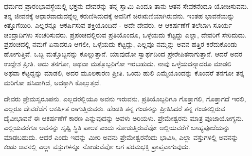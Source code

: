 ಧರ್ಮದ ಪ್ರಾರಂಭಾವಸ್ಥೆಯಲ್ಲಿ ಭಕ್ತನು ದೇವರನ್ನು ತನ್ನ ಸ್ವಾಮಿ ಎಂದೂ ತಾನು ಆತನ ಸೇವಕನೆಂದೂ ಯೋಚಿಸುವನು. ತನ್ನ ಜೀವನಕ್ಕೆ ಆಧಾರವಾದುದನ್ನೆಲ್ಲ ಕರುಣಿಸಿದುದಕ್ಕೆ ಅವನಿಗೆ ಚಿರಋಣಿಯಾಗಿರುವನು. ಇಂತಹ ಭಾವನೆಯನ್ನು ಕಿತ್ತೊಗೆಯಿರಿ. ಎಲ್ಲರನ್ನೂ ಆಕರ್ಷಿಸುವ ಶಕ್ತಿಯೊಂದಿದೆ - ಅದೇ ದೇವರು. ಆ ಆಕರ್ಷಣೆಗೆ ತಲೆಬಾಗಿ ಸೂರ್ಯ ಚಂದ್ರಾದಿಗಳು ಸಂಚರಿಸುವರು. ಪ್ರಪಂಚದಲ್ಲಿರುವ ಪ್ರತಿಯೊಂದೂ, ಒಳ್ಳೆಯದು ಕೆಟ್ಟದ್ದು ಎಲ್ಲಾ, ದೇವರಿಗೆ ಸೇರಿದುದು. ಪ್ರಪಂಚದಲ್ಲಿ ನಮಗೆ ಏನಾದರೂ ಆಗಲೀ, ಒಳ್ಳೆಯದು ಕೆಟ್ಟದ್ದು, ಎಲ್ಲವೂ ನಮ್ಮನ್ನು ಅವನ ಹತ್ತಿರ ಕರೆದುಕೊಂಡು ಹೋಗುತ್ತಿವೆ. ಒಬ್ಬ ಮತ್ತೊಬ್ಬನನ್ನು ಕೊಲ್ಲುತ್ತಾನೆ. ಯಾವುದೋ ಸ್ವಾರ್ಥದಿಂದ ಪ್ರೇರೇಪಿತನಾಗುತ್ತಾನೆ. ಆದರೆ ಅದರ ಉದ್ದೇಶ ಪ್ರೀತಿ. ಅದು ತನಗೋ, ಅಥವಾ ಮತ್ತೊಬ್ಬರಿಗೋ ಇರಬಹುದು. ನಾವು ಒಳ್ಳೆಯದನ್ನಾದರೂ ಮಾಡಲಿ ಅಥವಾ ಕೆಟ್ಟದ್ದನ್ನು ಮಾಡಲಿ, ಅದರ ಮೂಲಕಾರಣ ಪ್ರೀತಿ. ಒಂದು ಹುಲಿ ಎಮ್ಮೆಯೊಂದನ್ನು ಕೊಂದರೆ ತನಗೋ ತನ್ನ ಮರಿಗೋ ಹಸಿವಾಗಿದೆ, ಅದಕ್ಕಾಗಿ ಕೊಲ್ಲುತ್ತದೆ.

ದೇವರು ಪ್ರೇಮಸ್ವರೂಪನು. ಎಲ್ಲದರಲ್ಲಿಯೂ ಅವನು ಇರುವನು. ಪ್ರತಿಯೊಬ್ಬರಿಗೂ ಗೊತ್ತಾಗಲಿ, ಗೊತ್ತಾಗದೆ ಇರಲಿ, ಎಲ್ಲರೂ ದೇವರೆಡೆಗೆ ಆಕರ್ಷಿತ ರಾಗುತ್ತಿರುವರು. ಹೆಂಡತಿ ತನ್ನ ಗಂಡನನ್ನು ಪ್ರೀತಿಸಿದರೆ ತನ್ನ ಗಂಡನಲ್ಲಿರುವ ದೈವೀಭಾವನೆ ಈ ಆಕರ್ಷಣೆಗೆ ಕಾರಣ ಎನ್ನುವುದನ್ನು ಅವಳು ಅರಿಯಳು. ಪ್ರೇಮೇಶ್ವರನು ಮಾತ್ರ ಪೂಜಾಯೋಗ್ಯನು. ಎಲ್ಲಿಯವರೆಗೂ ಅವನನ್ನು ಸೃಷ್ಟಿ ಸ್ಥಿತಿ ಪಾಲಕ ಎಂದು ನೋಡುತ್ತಿರುವೆವೋ ಅಲ್ಲಿಯವರೆಗೆ ಬಾಹ್ಯಪೂಜೆಯನ್ನು ಮಾಡಬಹುದು. ಆದರೆ ಎಂದು ಇದನ್ನು ಮೀರಿ ಅವನು ಪ್ರೇಮೇಶ್ವರನೆಂದು ಭಾವಿಸಿ, ಎಲ್ಲಾ ವಸ್ತುಗಳಲ್ಲಿ ಅವನನ್ನು ಕಂಡು ಅವನಲ್ಲಿ ಎಲ್ಲಾ ವಸ್ತುಗಳನ್ನೂ ನೋಡುವೆವೋ ಆಗ ಪರಮಭಕ್ತಿ ಪ್ರಾಪ್ತವಾಗುವುದು.

